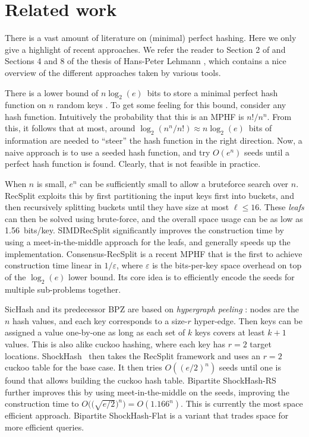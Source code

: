 \section{Related work}
\label{sec:org04db7a4}
There is a vast amount of literature on (minimal) perfect hashing. Here we only
give a highlight of recent approaches. We refer the reader to Section 2 of
\cite{pthash-2} and Sections 4 and 8 of the thesis of Hans-Peter Lehmann
\cite{phf-thesis}, which contains a nice overview of the different approaches
taken by various tools.

There is a lower bound of \(n \log_2(e)\)~bits to store a minimal perfect hash
function on \(n\) random keys \cite{mehlhorn82_mphf_size}.
To get some feeling for this bound, consider any hash function.
Intuitively the probability that this is
an MPHF is \(n!/n^n\). From this, it follows that at most, around
\(\log_2(n^n/n!)\approx n\log_2(e)\)~bits of information are needed to ``steer'' the hash
function in the right direction.
Now, a naive approach is to use a seeded hash function, and try
\(O(e^n)\) seeds until a perfect hash function is found. Clearly, that is not
feasible in practice.

When \(n\) is small, \(e^n\) can be sufficiently small to allow a bruteforce search
over \(n\). RecSplit exploits this by first partitioning the input
keys first into buckets, and then recursively splitting buckets until they have
size at most \(\ell \leq 16\). These \emph{leafs} can then be solved using brute-force, and the
overall space usage can be as low as 1.56~bits/key. SIMDRecSplit significantly
improves the construction time by using a meet-in-the-middle approach for the
leafs, and generally speeds up the implementation.
Consensus-RecSplit \cite{consensus} is a recent MPHF that is the first to
achieve construction time linear in \(1/\varepsilon\), where \(\varepsilon\) is the
bits-per-key space overhead on top of the \(\log_2(e)\) lower bound. Its core idea
is to efficiently encode the seeds for multiple sub-problems together.

SicHash \cite{sichash} and its predecessor BPZ \cite{bpz} are based on
\emph{hypergraph peeling} \cite{mphf-peeling,hypergraph-peeling-bounds}: nodes are the \(n\) hash values, and each key
corresponds to a size-\(r\) hyper-edge. Then keys can be assigned a value
one-by-one as long as each set of \(k\) keys covers at least \(k+1\) values. This
is also alike cuckoo hashing, where each key has \(r=2\) target locations.
ShockHash~\cite{shockhash} then takes the RecSplit framework and uses an \(r=2\)
cuckoo table for the base case. It then tries \(O((e/2)^n)\) seeds until one is
found that allows building the cuckoo hash table.
Bipartite ShockHash-RS \cite{bipartite-shockhash}
further improves this by using meet-in-the-middle on the seeds, improving the
construction time to \(O\big(\big(\sqrt{e/2}\big)^n\big) = O(1.166^n)\). This is currently the
most space efficient approach. Bipartite ShockHash-Flat is a variant that trades
space for more efficient queries.

